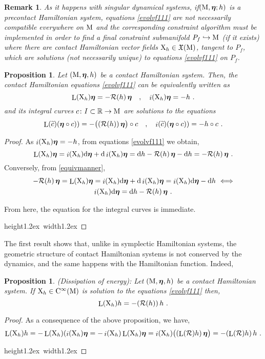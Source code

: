 \documentclass[12pt]{report}
\newtheorem{prop}[teor]{Proposition}
\newtheorem{remark}[teor]{Remark}
\def\beq{\begin{equation}}
\def\eeq{\end{equation}}
\def\qed{\ifvmode\removelastskip\fi
{\unskip\nobreak\hfil\penalty50\hbox{}\nobreak\hfil
\hbox{\vrule height1.2ex width1.2ex}\parfillskip=0pt
\finalhyphendemerits=0 \par\smallskip}}
\def\vf{\mathfrak X}
\def\d{{\rm d}}
\def\Real{\mathbb{R}}
\def\bmeta{\mbox{\boldmath $\eta$}}
\def\X{{\rm X}}
\def\Lie{\mathop{\rm L}\nolimits}
\def\inn{\mathop{i}\nolimits}
\def\Cinfty{{\rm C}^\infty}
\newcommand{\Reeb}{\mathcal{R}}
\begin{document}
\begin{remark}{\rm 
As it happens with singular dynamical systems,
if$({\rm M},\bmeta;h)$ is a precontact Hamiltonian system,
equations \eqref{evolvf111} are not necessarily compatible everywhere on ${\rm M}$ 
and the corresponding constraint algorithm must be implemented in order to find 
a {\sl final constraint submanifold} $P_f\hookrightarrow {\rm M}$
(if it exists) where there are contact Hamiltonian vector fields $\X_h\in\vf({\rm M})$,
tangent to $P_f$, which are solutions (not necessarily unique) to equations \eqref{evolvf111} on $P_f$.
}\end{remark}

\begin{prop}
Let $({\rm M},\bmeta,h)$ be a contact Hamiltonian system.
Then, the contact Hamiltonian equations \eqref{evolvf111} can be equivalently written as
\begin{equation}
 \Lie(\X_h)\bmeta= -\Reeb(h)\,\bmeta \quad ,\quad  \inn(\X_h)\bmeta = -h \ .
 \label{equivmanner}
\end{equation}
and its integral curves $c\colon I\subset\Real\to {\rm M}$  are solutions to the equations
\begin{equation*}
 \Lie(\widetilde c)(\bmeta\circ c))= -\big((\Reeb(h))\,\bmeta\big)\circ c \quad ,\quad  \inn(\widetilde c)(\bmeta\circ c)) = -h\circ c  \ .
\end{equation*}
\end{prop}
\begin{proof}
As $\inn(\X_h)\bmeta=-h$, from equations \eqref{evolvf111} we obtain,
$$
\Lie(\X_h)\bmeta=
\inn(\X_h)\d\bmeta+\d\inn(\X_h)\bmeta=
\d h-\Reeb(h)\,\bmeta-\d h=-\Reeb(h)\,\bmeta \ .
$$
Conversely, from \eqref{equivmanner},
\begin{multline*}
-\Reeb(h)\,\bmeta=\Lie(\X_h)\bmeta= 
\inn(\X_h)\d\bmeta+\d\inn(\X_h)\bmeta=
\inn(\X_h)\d\bmeta-\d h \ \Longleftrightarrow \\
\inn(\X_h)\d\bmeta=\d h-\Reeb(h)\,\bmeta \ .
\end{multline*}


From here, the equation for the integral curves is immediate. 
\\ \qed\end{proof}

The first result shows that,
unlike in symplectic Hamiltonian systems, the geometric structure of contact Hamiltonian systems is not conserved by the dynamics,
and the same happens with the Hamiltonian function. Indeed,

\begin{prop} {\rm (Dissipation of energy):}
Let $({\rm M},\bmeta,h)$ be a contact Hamiltonian system. If $\X_h\in\Cinfty({\rm M})$ is solution to the equations \eqref{evolvf111} then,
\beq
\Lie(\X_h)h=-(\Reeb(h))\,h \ .
\label{eq:disipenerg}
\eeq
\label{disipenerg}
\end{prop}
\vspace{-1cm}
\begin{proof}
As a consequence of the above proposition, we have,
$$
\Lie(\X_h)h=-\Lie(\X_h)(\inn(\X_h)\bmeta=
-\inn(\X_h)\Lie(\X_h)\bmeta=
\inn(\X_h)\big((\Lie(\Reeb)h)\,\bmeta\big)=-(\Lie(\Reeb)h)\,h\ .
$$
\qed\end{proof}
\end{document}
